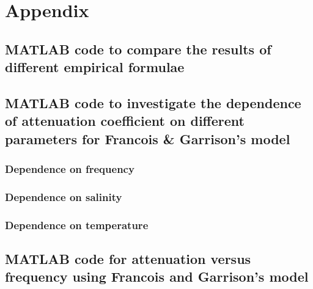 
\chapter{Appendix} \label{Appendix}

\section{ MATLAB code to compare the results of different empirical formulae } \label{MATLAB code to compare the results of different empirical formulae}



\newpage

\section{MATLAB code to investigate the dependence of attenuation coefficient on different parameters for Francois \& Garrison's model} \label{MATLAB code to investigate the dependence of attenuation coefficient on different parameters for Francois and Garrison's model} 

\subsection{Dependence on frequency} \label{Dependence on frequency} 

\newpage
\subsection{Dependence on salinity} \label{Dependence on salinity} 

\newpage
\subsection{Dependence on temperature} \label{Dependence on temperature} 

\newpage
\section{ MATLAB code for  attenuation versus frequency using Francois and Garrison's model} \label{ MATLAB code for  attenuation versus frequency using Francois & Garrison's model}


